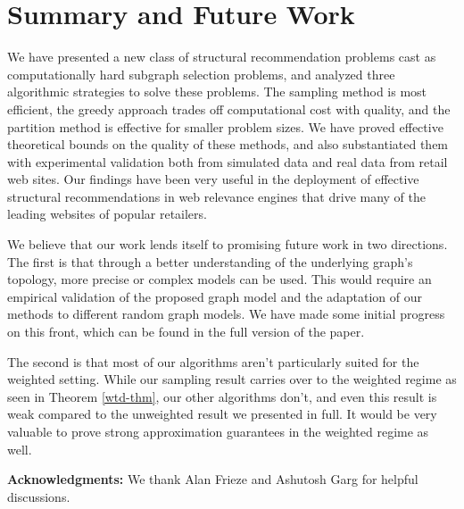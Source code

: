 \vspace{-0.1in}
\section{Summary and Future Work}
We have presented a new class of structural recommendation problems
cast as computationally hard subgraph selection problems, and analyzed three algorithmic
strategies to solve these problems.
The sampling method is most
efficient, the greedy approach trades off computational cost with
quality, and the partition method is effective for smaller problem
sizes. We have proved effective theoretical bounds on the quality
of these methods, and also substantiated them with experimental
validation both from simulated data and real data from
retail web sites. Our findings have been very useful in the
deployment of effective structural recommendations in web relevance
engines that drive many of the leading websites of popular retailers.

We believe that our work lends itself to promising future work in two directions.
The first is that through a better understanding of the underlying graph's topology,
more precise or complex models can be used. This would require an empirical validation of
the proposed graph model and the adaptation of our methods to different random graph models.
We have made some initial progress on this front, which can be found in the full version of the paper.

The second is that most of our algorithms aren't particularly suited for the weighted setting. While our sampling result carries over to the weighted regime as seen in Theorem \ref{wtd-thm}, our other algorithms don't, and even this result is weak compared to the unweighted result we presented in full. It would be very valuable to prove strong approximation guarantees in the weighted regime as well. \vs

\iffalse
Our sampling method and its analysis extends to more general
models of random graphs: in one version, we can consider
hierarchical models that take into account the product hierarchy
trees under which the pages in $L$ and $R$ are situated. A second
version considers a Cartesian product model where the pages in $L$
and $R$ are partitioned into closely related blocks and the graph
induced between every pair of left-right blocks follows a fixed
degree random model. A third variant models the potential flow of
customer traffic over each possible recommended edge from a left to
right page with nonnegative weights, and the resulting problem is
to find a subgraph where the number of right nodes with at least a
certain minimum amount of recommended traffic. Validating these
more general models by fitting real life data to them as well as
corroborating the performance of various methods in simulated and
real data for these models could yield an even better understanding
of our suggested algorithmic strategies for the
recommendation subgraph problem.\vs
\fi

{\bf Acknowledgments:} We thank Alan Frieze and Ashutosh Garg for helpful
discussions.

\vspace{-.05in} 